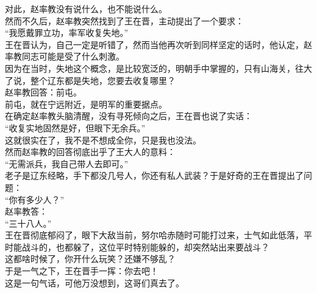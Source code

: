 \begin{multicols}{\theparacolNo}
对此，赵率教没有说什么，也不能说什么。\\

然而不久后，赵率教突然找到了王在晋，主动提出了一个要求：\\

“我愿戴罪立功，率军收复失地。”\\

王在晋认为，自己一定是听错了，然而当他再次听到同样坚定的话时，他认定，赵率教同志可能是受了什么刺激。\\

因为在当时，失地这个概念，是比较宽泛的，明朝手中掌握的，只有山海关，往大了说，整个辽东都是失地，您要去收复哪里？\\

赵率教回答：前屯。\\

前屯，就在宁远附近，是明军的重要据点。\\

在确定赵率教头脑清醒，没有寻死倾向之后，王在晋也说了实话：\\

“收复实地固然是好，但眼下无余兵。”\\

这就很实在了，我不是不想成全你，只是我也没法。\\

然而赵率教的回答彻底出乎了王大人的意料：\\

“无需派兵，我自己带人去即可。”\\

老子是辽东经略，手下都没几号人，你还有私人武装？于是好奇的王在晋提出了问题：\\

“你有多少人？”\\

赵率教答：\\

“三十八人。”\\

王在晋彻底郁闷了，眼下大敌当前，努尔哈赤随时可能打过来，士气如此低落，平时能战斗的，也都躲了，这位平时特别能躲的，却突然站出来要战斗？\\

这都啥时候了，你开什么玩笑？还嫌不够乱？\\

于是一气之下，王在晋手一挥：你去吧！\\

这是一句气话，可他万没想到，这哥们真去了。\\


\end{multicols}
